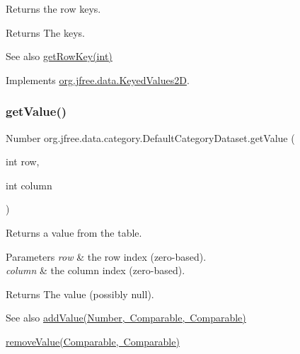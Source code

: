Returns the row keys.

\begin{DoxyReturn}{Returns}
The keys.
\end{DoxyReturn}
\begin{DoxySeeAlso}{See also}
\mbox{\hyperlink{classorg_1_1jfree_1_1data_1_1category_1_1_default_category_dataset_a8828cdefd54d499565516fa42d44f89a}{get\+Row\+Key(int)}} 
\end{DoxySeeAlso}


Implements \mbox{\hyperlink{interfaceorg_1_1jfree_1_1data_1_1_keyed_values2_d_aeda9aab284e61f69ca6e81370e76f70a}{org.\+jfree.\+data.\+Keyed\+Values2D}}.

\mbox{\label{classorg_1_1jfree_1_1data_1_1category_1_1_default_category_dataset_a981ce76eb60f9627756108f7f7a49933}} 
\subsubsection{\texorpdfstring{get\+Value()}{getValue()}\hspace{0.1cm}{\footnotesize\ttfamily [1/2]}}
{\footnotesize\ttfamily Number org.\+jfree.\+data.\+category.\+Default\+Category\+Dataset.\+get\+Value (\begin{DoxyParamCaption}\item[{int}]{row,  }\item[{int}]{column }\end{DoxyParamCaption})}

Returns a value from the table.


\begin{DoxyParams}{Parameters}
{\em row} & the row index (zero-\/based). \\
\hline
{\em column} & the column index (zero-\/based).\\
\hline
\end{DoxyParams}
\begin{DoxyReturn}{Returns}
The value (possibly {\ttfamily null}).
\end{DoxyReturn}
\begin{DoxySeeAlso}{See also}
\mbox{\hyperlink{classorg_1_1jfree_1_1data_1_1category_1_1_default_category_dataset_a69d2a96abc039f088e63b39fcaa4cbe1}{add\+Value(\+Number, Comparable, Comparable)}} 

\mbox{\hyperlink{classorg_1_1jfree_1_1data_1_1category_1_1_default_category_dataset_adc052d373a3e65d0a9c955cb79fc2283}{remove\+Value(\+Comparable, Comparable)}} 
\end{DoxySeeAlso}


